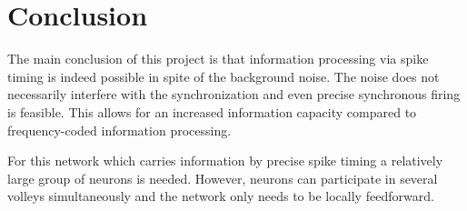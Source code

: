 \documentclass[12pt,a4paper, bibliography=totoc, listof=numbered, footexclude]{scrartcl}
\begin{document}
  \section{Conclusion}
  
  The main conclusion of this project is that information processing via spike timing is indeed possible in spite of the background noise. The noise does not necessarily interfere with the synchronization and even precise synchronous firing is feasible. This allows for an increased information capacity compared to frequency-coded information processing.
  
  For this network which carries information by precise spike timing a relatively large group of neurons is needed. However, neurons can participate in several volleys simultaneously and the network only needs to be locally feedforward.
 
\end{document}
